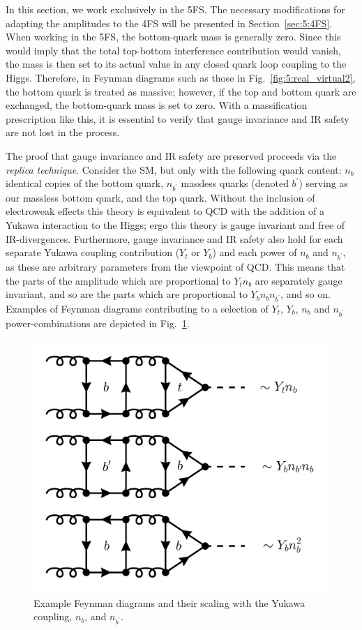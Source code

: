 In this section, we work exclusively in the 5\acs{FS}. The necessary modifications for adapting the amplitudes to the 4\acs{FS} will be presented in Section~\ref{sec:5:4FS}. When working in the 5\acs{FS}, the bottom-quark mass is generally zero. Since this would imply that the total top-bottom interference contribution would vanish, the mass is then set to its actual value in any closed quark loop coupling to the Higgs. Therefore, in Feynman diagrams such as those in Fig.~\ref{fig:5:real_virtual2}, the bottom quark is treated as massive; however, if the top and bottom quark are exchanged, the bottom-quark mass is set to zero. With a massification prescription like this, it is essential to verify that gauge invariance and \acs{IR} safety are not lost in the process.

The proof that gauge invariance and \acs{IR} safety are preserved proceeds via the \textit{replica technique}. Consider the \acs{SM}, but only with the following quark content: $n_b$ identical copies of the bottom quark, $n_{b^\prime}$ massless quarks (denoted $b^\prime$) serving as our massless bottom quark, and the top quark. Without the inclusion of electroweak effects this theory is equivalent to \acs{QCD} with the addition of a Yukawa interaction to the Higgs; ergo this theory is gauge invariant and free of \acs{IR}-divergences. Furthermore, gauge invariance and \acs{IR} safety also hold for each separate Yukawa coupling contribution ($Y_t$ or $Y_b$) and each power of $n_b$ and $n_{b^\prime}$, as these are arbitrary parameters from the viewpoint of \acs{QCD}. This means that the parts of the amplitude which are proportional to $Y_t n_b$ are separately gauge invariant, and so are the parts which are proportional to $Y_b n_b n_{b^\prime}$, and so on. Examples of Feynman diagrams contributing to a selection of $Y_t$, $Y_b$, $n_b$ and $n_{b^\prime}$ power-combinations are depicted in Fig.~\ref{fig:5:replica}.
\begin{figure}[ht]
\centering
\includegraphics[scale=0.25]{Images/NNLO_Feynman_diagrams/replica.pdf}
\caption{Example Feynman diagrams and their scaling with the Yukawa coupling, $n_b$, and $n_{b^\prime}$.}
\label{fig:5:replica}
\end{figure}
